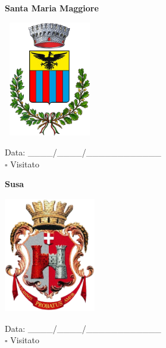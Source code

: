 \documentclass[a5paper,12pt]{article}
\begin{document}
\newpage

\noindent
\begin{minipage}[t]{0.45\textwidth}
    \begin{center}
        \textbf{Santa Maria Maggiore}
    \end{center}
    \vspace{-0.5cm} %
    \begin{center}
        \includegraphics[height= 5cm, width=4cm]{Piemonte/Stemma Santa Maria Maggiore.png}
    \end{center}
    \vspace{-0.4cm} %
    \begin{flushleft}
        Data: \_\_\_\_/\_\_\_\_/\_\_\_\_\_\_\_\_\_\_\_\_ \\
        $\square$ Visitato
    \end{flushleft}
\end{minipage}
\hfill
\noindent
\begin{minipage}[t]{0.45\textwidth}
    \begin{center}
        \textbf{Susa}
    \end{center}
    \vspace{-0.5cm} %
    \begin{center}
        \includegraphics[height= 5cm, width=4cm]{Piemonte/Stemma Susa.png}
    \end{center}
    \vspace{-0.4cm} %
    \begin{flushleft}
        Data: \_\_\_\_/\_\_\_\_/\_\_\_\_\_\_\_\_\_\_\_\_ \\
        $\square$ Visitato
    \end{flushleft}
\end{minipage}
\end{document}
